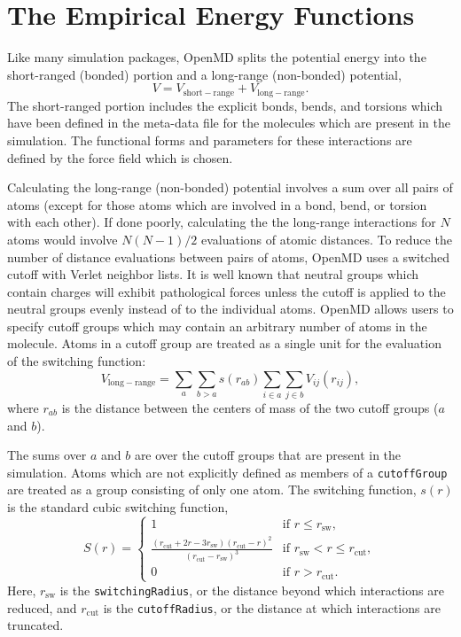 \documentclass[]{book}
\begin{document}
\chapter{\label{section:empiricalEnergy}The Empirical Energy
Functions}

Like many simulation packages, {\sc OpenMD} splits the potential energy
into the short-ranged (bonded) portion and a long-range (non-bonded)
potential,
\begin{equation}
V = V_{\mathrm{short-range}} + V_{\mathrm{long-range}}.
\end{equation}
The short-ranged portion includes the explicit bonds, bends, and
torsions which have been defined in the meta-data file for the
molecules which are present in the simulation.  The functional forms and
parameters for these interactions are defined by the force field which
is chosen.

Calculating the long-range (non-bonded) potential involves a sum over
all pairs of atoms (except for those atoms which are involved in a
bond, bend, or torsion with each other).  If done poorly, calculating
the the long-range interactions for $N$ atoms would involve $N(N-1)/2$
evaluations of atomic distances.  To reduce the number of distance
evaluations between pairs of atoms, {\sc OpenMD} uses a switched cutoff
with Verlet neighbor lists.\cite{Allen87} It is well known that
neutral groups which contain charges will exhibit pathological forces
unless the cutoff is applied to the neutral groups evenly instead of
to the individual atoms.\cite{leach01:mm} {\sc OpenMD} allows users to
specify cutoff groups which may contain an arbitrary number of atoms
in the molecule.  Atoms in a cutoff group are treated as a single unit
for the evaluation of the switching function:
\begin{equation}
V_{\mathrm{long-range}} = \sum_{a} \sum_{b>a} s(r_{ab}) \sum_{i \in a} \sum_{j \in b} V_{ij}(r_{ij}),
\end{equation}
where $r_{ab}$ is the distance between the centers of mass of the two
cutoff groups ($a$ and $b$).

The sums over $a$ and $b$ are over the cutoff groups that are present
in the simulation.  Atoms which are not explicitly defined as members
of a {\tt cutoffGroup} are treated as a group consisting of only one
atom.  The switching function, $s(r)$ is the standard cubic switching
function,
\begin{equation}
S(r) = 
	\begin{cases}
	1 & \text{if $r \le r_{\text{sw}}$},\\
	\frac{(r_{\text{cut}} + 2r - 3r_{\text{sw}})(r_{\text{cut}} - r)^2}
	{(r_{\text{cut}} - r_{\text{sw}})^3} 
	& \text{if $r_{\text{sw}} < r \le r_{\text{cut}}$}, \\
	0 & \text{if $r > r_{\text{cut}}$.}
	\end{cases}
\label{eq:dipoleSwitching}
\end{equation}
Here, $r_{\text{sw}}$ is the {\tt switchingRadius}, or the distance
beyond which interactions are reduced, and $r_{\text{cut}}$ is the
{\tt cutoffRadius}, or the distance at which interactions are
truncated.
\end{document}
